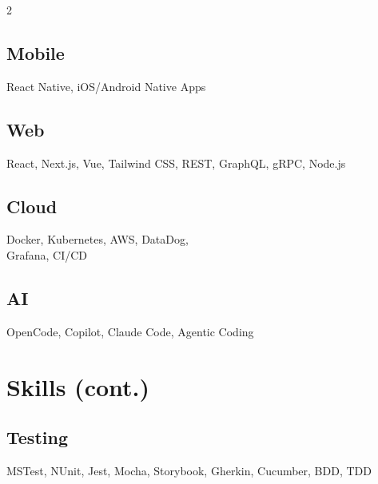 \documentclass{article}
\begin{document}
\begin{paracol}{2}
\begin{leftcolumn}
    \subsection{Mobile}
    React Native, iOS/Android Native Apps

    \vspace{0.5em}

    \subsection{Web}
    React, Next.js, Vue, Tailwind CSS, REST, GraphQL, gRPC, Node.js

    \vspace{0.5em}

    \subsection{Cloud}
    Docker, Kubernetes, AWS, DataDog,\\
    Grafana, CI/CD

    \vspace{0.5em}

    \subsection{AI}
    OpenCode, Copilot, Claude Code, Agentic Coding

    \pagebreak
    \section{Skills (cont.)}

    \subsection{Testing}
    MSTest, NUnit, Jest, Mocha, Storybook, Gherkin, Cucumber, BDD, TDD

    \vspace{0.5em}


\end{leftcolumn}
\end{paracol}
\end{document}
